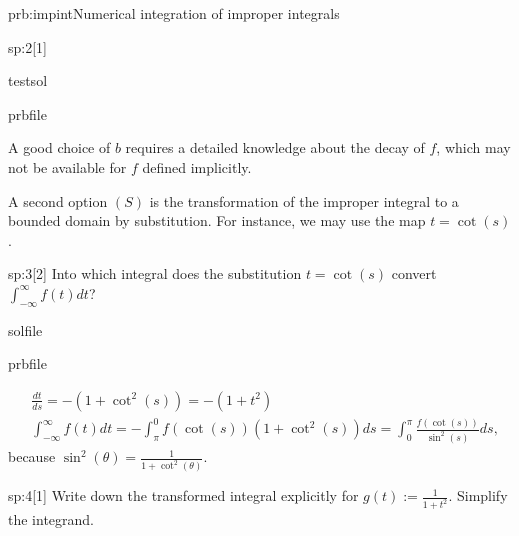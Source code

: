 \begin{samproblem}{prb:impint}{Numerical integration of improper integrals}
\begin{subproblem}{sp:2}[1]
  \begin{samwriteprbpart}{testsol}
    \begin{writeverbatim}{prbfile}
      \begin{samsolution}
        A good choice of $b$ requires a detailed knowledge about the decay of $f$, which may not be available for $f$ defined implicitly.
      \end{samsolution}
    \end{writeverbatim}
  \end{samwriteprbpart}

\end{subproblem}

 A second option $(S)$ is the transformation of the improper integral to a bounded domain by substitution. For instance, we may use the map $t = \cot(s)$.
 
\begin{subproblem}{sp:3}[2]
  Into which integral does the substitution $t = \cot(s)$ convert $\int_{-\infty}^{\infty} f(t) dt$?


  \begin{samwriteprbpart}{solfile}
    \begin{writeverbatim}{prbfile}
      \begin{samsolution}
        \begin{align}
          &\frac{dt}{ds} = - (1+\cot^2(s)) = -(1+t^2) \\
          & \int_{-\infty}^{\infty} f(t) dt = - \int_\pi^0 f(\cot(s)) (1+\cot^2(s)) ds = \int_0^\pi \frac{f(\cot(s))}{\sin^2(s)} ds,
        \end{align}
        because $\sin^2(\theta) = \frac{1}{1+\cot^2(\theta)}$.
      \end{samsolution}
    \end{writeverbatim}
  \end{samwriteprbpart}

\end{subproblem}
 
\begin{subproblem}{sp:4}[1]
  Write down the transformed integral explicitly for $g(t) := \frac{1}{1+t^2}$. Simplify the integrand.


\end{subproblem}
\end{samproblem}
